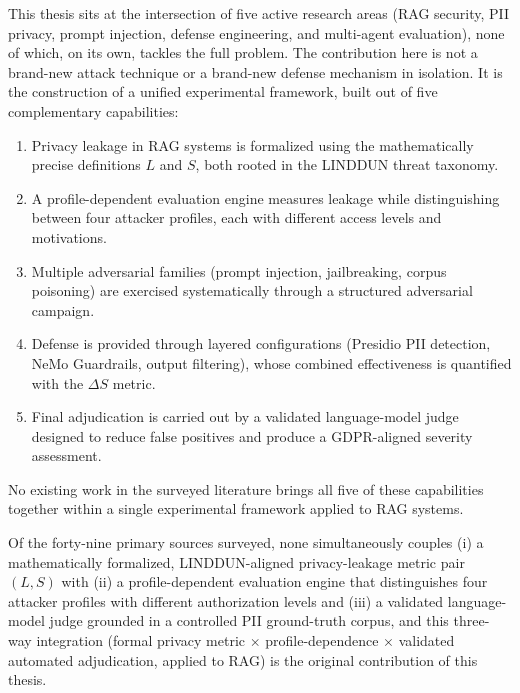 \documentclass[12pt,a4paper]{report}
\begin{document}
\begin{notebox}
This thesis sits at the intersection of five active research areas (RAG security, PII privacy, prompt injection, defense engineering, and multi-agent evaluation), none of which, on its own, tackles the full problem. The contribution here is not a brand-new attack technique or a brand-new defense mechanism in isolation. It is the construction of a unified experimental framework, built out of five complementary capabilities:

\begin{enumerate}[leftmargin=1.5em, itemsep=3pt]
  \item Privacy leakage in RAG systems is formalized using the mathematically precise definitions $L$ and $S$, both rooted in the LINDDUN threat taxonomy.
  \item A profile-dependent evaluation engine measures leakage while distinguishing between four attacker profiles, each with different access levels and motivations.
  \item Multiple adversarial families (prompt injection, jailbreaking, corpus poisoning) are exercised systematically through a structured adversarial campaign.
  \item Defense is provided through layered configurations (Presidio PII detection, NeMo Guardrails, output filtering), whose combined effectiveness is quantified with the $\Delta S$ metric.
  \item Final adjudication is carried out by a validated language-model judge designed to reduce false positives and produce a GDPR-aligned severity assessment.
\end{enumerate}

No existing work in the surveyed literature brings all five of these capabilities together within a single experimental framework applied to RAG systems.
\end{notebox}

\begin{transitionbox}
Of the forty-nine primary sources surveyed, none simultaneously couples (i) a mathematically formalized, LINDDUN-aligned privacy-leakage metric pair $(L, S)$ with (ii) a profile-dependent evaluation engine that distinguishes four attacker profiles with different authorization levels and (iii) a validated language-model judge grounded in a controlled PII ground-truth corpus, and this three-way integration (formal privacy metric $\times$ profile-dependence $\times$ validated automated adjudication, applied to RAG) is the original contribution of this thesis.
\end{transitionbox}
\end{document}
